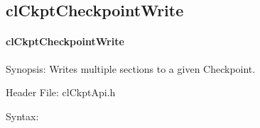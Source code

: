 \begin{flushleft}
\subsection{clCkptCheckpointWrite}
\hypertarget{pageckpt116}{}\paragraph{cl\-Ckpt\-Checkpoint\-Write}\label{pageckpt116}
\begin{Desc}
\item[Synopsis:]Writes multiple sections to a given Checkpoint.\end{Desc}
\begin{Desc}
\item[Header File:]clCkptApi.h\end{Desc}
\begin{Desc}
\item[Syntax:]


\end{Desc}
\end{flushleft}
